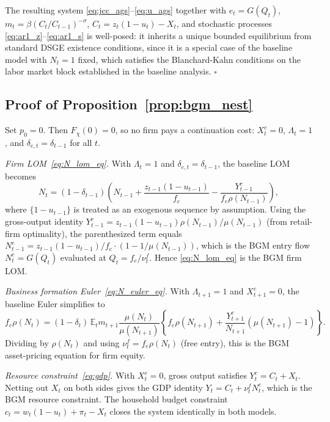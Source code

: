 \documentclass[authoryear, review, 12pt]{elsarticle}
\begin{document}
The resulting system
\eqref{eq:jcc_ags}--\eqref{eq:u_ags} together
with $e_t=G(Q_t)$, $m_t=\beta(C_t/C_{t-1})^{-\sigma}$,
$C_t=z_t(1-u_t)-X_t$, and stochastic processes
\eqref{eq:ar1_z}--\eqref{eq:ar1_s} is well-posed:
it inherits a unique bounded equilibrium from
standard DSGE existence conditions, since it is
a special case of the baseline model with
$N_t=1$ fixed, which satisfies the Blanchard-Kahn
conditions on the labor market block established
in the baseline analysis. \hfill$\square$

\subsection*{Proof of Proposition~\ref{prop:bgm_nest}}

Set $p_0=0$. Then $F_\chi(0)=0$, so no firm pays a
continuation cost: $X_t^c=0$, $\Lambda_t=1$, and
$\delta_{e,t}=\delta_{t-1}$ for all $t$.

\emph{Firm LOM~\eqref{eq:N_lom_eq}.} With $\Lambda_t=1$
and $\delta_{e,t}=\delta_{t-1}$, the baseline LOM becomes
\begin{equation*}
  N_t = (1-\delta_{t-1})\!\left(N_{t-1}
  + \frac{z_{t-1}(1-u_{t-1})}{f_e}
  - \frac{Y_{t-1}^c}{f_e\rho(N_{t-1})}\right),
\end{equation*}
where $\{1-u_{t-1}\}$ is treated as an exogenous
sequence by assumption.  Using the gross-output identity
$Y_{t-1}^c = z_{t-1}(1-u_{t-1})\rho(N_{t-1})/\mu(N_{t-1})$
(from retail-firm optimality), the parenthesized term
equals $N_{t-1}^e = z_{t-1}(1-u_{t-1})/f_e \cdot
(1-1/\mu(N_{t-1}))$, which is the BGM entry flow
$N_t^e = G(Q_t)$ evaluated at $Q_t = f_e/\nu_t^f$.
Hence \eqref{eq:N_lom_eq} is the BGM firm LOM.

\emph{Business formation Euler~\eqref{eq:N_euler_eq}.}
With $\Lambda_{t+1}=1$ and $X_{t+1}^c=0$, the baseline
Euler simplifies to
\begin{equation*}
  f_e\rho(N_t) = (1-\delta_t)\,\mathbb{E}_t m_{t+1}
  \frac{\mu(N_t)}{\mu(N_{t+1})}
  \left\{f_e\rho(N_{t+1})
  + \frac{Y_{t+1}^c}{N_{t+1}}(\mu(N_{t+1})-1)\right\}.
\end{equation*}
Dividing by $\rho(N_t)$ and using
$\nu_t^f = f_e\rho(N_t)$ (free entry), this is the BGM
asset-pricing equation for firm equity.

\emph{Resource constraint~\eqref{eq:gdp}.} With
$X_t^c=0$, gross output satisfies $Y_t^c = C_t + X_t$.
Netting out $X_t$ on both sides gives the GDP identity
$Y_t = C_t + \nu_t^f N_t^e$, which is the BGM resource constraint.
The household budget constraint
$c_t = w_t(1-u_t) + \pi_t - X_t$
closes the system identically in both models.
\end{document}
